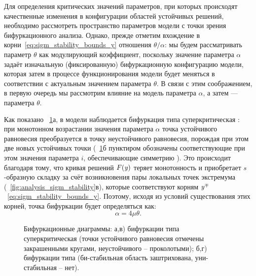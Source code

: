 Для определения критических значений параметров, при которых происходят качественные изменения в конфигурации областей устойчивых решений, необходимо рассмотреть пространство параметров модели с точки зрения бифуркационного анализа. Однако, прежде отметим вхождение в корни~\eqref{eq:sigm_stability_bounds_y} отношения $\theta/\alpha$: мы будем рассматривать параметр $\theta$ как модулирующий коэффициент, поскольку значение параметра $\alpha$ задаёт изначальную (фиксированную) бифуркационную конфигурацию модели, которая затем в процессе функционирования модели будет меняться в соответствии с актуальным значением параметра $\theta$. В связи с этим соображением, в первую очередь мы рассмотрим влияние на модель параметра $\alpha$, а затем --- параметра $\theta$.

Как показано \onfigure~\ref{fig:analysis_sigm_bifurcations}а, в модели наблюдается бифуркация типа суперкритическая : при монотонном возрастании значения параметра $\alpha$ точка устойчивого равновесия преобразуется в точку неустойчивого равновесия, порождая при этом две новых устойчивых точки (\onfigure~\ref{fig:analysis_sigm_bifurcations}б пунктиром обозначены соответствующие при этом значения параметра $i$, обеспечивающие симметрию ). Это происходит благодаря тому, что кривая решений $F(\mathit{y})$ теряет монотонность и приобретает $s$-образную складку за счёт возникновения пары локальных точек экстремума (\seefigure~\ref{fig:analysis_sigm_stability}в), которые соответствуют корням $\mathit{y}^{\mp}$~\eqref{eq:sigm_stability_bounds_y}. Поэтому, исходя из условий существования этих корней, точка бифуркации будет определяться как:
\begin{equation}
    \label{eq:sigm_bifurcation_alpha}
    \alpha =  4 \mu \theta.
\end{equation}

\begin{figure}[ht]
    \caption{Бифуркационные диаграммы: а,в) бифуркации типа суперкритическая  (точки устойчивого равновесия отмечены закрашенными кругами, неустойчивого -- проколотыми); б,г) бифуркации типа  (би-стабильная область заштрихована, уни-стабильная -- нет).}
    \label{fig:analysis_sigm_bifurcations}
\end{figure}

